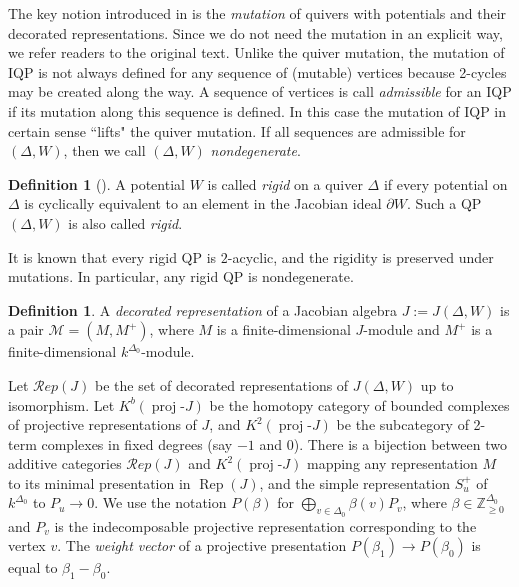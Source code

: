 \documentclass{amsart}
\theoremstyle{definition}
\newtheorem{definition}[theorem]{Definition}
\theoremstyle{remark}
\numberwithin{equation}{section}
\DeclareMathOperator{\Rep}{Rep}
\newcommand{\mc}[1]{\mathcal{#1}}
\newcommand{\mb}[1]{\mathbb{#1}}
\newcommand{\proj}{\operatorname{proj}\text{-}}
\begin{document}
The key notion introduced in \cite{DWZ1,DWZ2} is the {\em mutation} of quivers with potentials and their decorated representations.
Since we do not need the mutation in an explicit way, we refer readers to the original text.
Unlike the quiver mutation, the mutation of IQP is not always defined for any sequence of (mutable) vertices because 2-cycles may be created along the way.
A sequence of vertices is call {\em admissible} for an IQP if its mutation along this sequence is defined. 
In this case the mutation of IQP in certain sense ``lifts" the quiver mutation.
If all sequences are admissible for $(\Delta,W)$, then we call $(\Delta,W)$ {\em nondegenerate}.
\begin{definition}[\cite{DWZ1}] A potential $W$ is called {\em rigid} on a quiver $\Delta$ if
	every potential on $\Delta$ is cyclically equivalent to an element in the Jacobian ideal $\partial W$.
	Such a QP $(\Delta,W)$ is also called {\em rigid}.
\end{definition}
\noindent It is known \cite[Proposition 8.1, Corollary 6.11]{DWZ1} that every rigid QP is $2$-acyclic, and the rigidity is preserved under mutations. In particular, any rigid QP is nondegenerate.



\begin{definition} A {\em decorated representation} of a Jacobian algebra $J:=J(\Delta,W)$ is a pair $\mc{M}=(M,M^+)$,
	where $M$ is a finite-dimensional $J$-module and $M^+$ is a finite-dimensional $k^{\Delta_0}$-module.
\end{definition}

Let $\mc{R}ep(J)$ be the set of decorated representations of $J(\Delta,W)$ up to isomorphism. 
Let $K^b(\proj J)$ be the homotopy category of bounded complexes of projective representations of $J$,
and $K^2(\proj J)$ be the subcategory of 2-term complexes in fixed degrees (say $-1$ and $0$).
There is a bijection between two additive categories $\mc{R}ep(J)$ and $K^2(\proj J)$ mapping any representation $M$ to its minimal presentation in $\Rep(J)$, and the simple representation $S_u^+$ of $k^{\Delta_0}$ to $P_u\to 0$.
We use the notation $P(\beta)$ for $\bigoplus_{v\in \Delta_0} \beta(v) P_v$, 
where $\beta\in \mb{Z}_{\geqslant 0}^{\Delta_0}$ and $P_v$ is the indecomposable projective representation corresponding to the vertex $v$.
The {\em weight vector} of a projective presentation $P(\beta_1)\to P(\beta_0)$ is equal to $\beta_1-\beta_0$.
\end{document}
